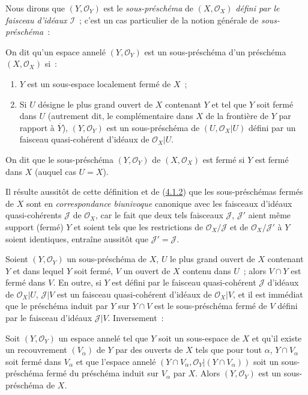 Nous dirons que $(Y,\mathscr{O}_Y)$ est le \emph{sous-préschéma} de
$(X,\mathscr{O}_X)$ \emph{défini par le faisceau d'idéaux $\mathscr{I}$}~;
c'est un cas particulier de la notion générale de \emph{sous-préschéma}~:

\begin{definition}[4.1.3]
\label{I.4.1.3-fr}
On dit qu'un espace annelé $(Y,\mathscr{O}_Y)$ est un
sous-préschéma d'un préschéma $(X,\mathscr{O}_X)$ si~:
\begin{enumerate}
  \item[$1^\circ$] $Y$ est un sous-espace localement fermé de $X$~;
  \item[$2^\circ$] Si $U$ désigne le plus grand ouvert de $X$ contenant $Y$
  et tel que $Y$ soit fermé dans $U$ (\textup{autrement dit,} le complémentaire dans
  $X$ de la frontière de $Y$ par rapport à $\overline{Y}$),
  $(Y,\mathscr{O}_Y)$ est un sous-préschéma de
  $(U,\mathscr{O}_X|U)$ défini par un faisceau quasi-cohérent d'idéaux de
  $\mathscr{O}_X|U$.
\end{enumerate}
On dit que le sous-préschéma $(Y,\mathscr{O}_Y)$ de $(X,\mathscr{O}_X)$ est
fermé si $Y$ est fermé dans $X$ (auquel cas $U=X$).
\end{definition}

Il résulte aussitôt de cette définition et de
(\hyperref[I.4.1.2-fr]{4.1.2}) que les sous-préschémas fermés de $X$ sont en
\emph{correspondance biunivoque} canonique avec les faisceaux d'idéaux
quasi-cohérents $\mathscr{J}$ de $\mathscr{O}_X$, car le fait que deux tels
faisceaux $\mathscr{J}$, $\mathscr{J}'$ aient même support (fermé) $Y$ et
soient tels que les restrictions de $\mathscr{O}_X/\mathscr{J}$ et de
$\mathscr{O}_X/\mathscr{J}'$ à $Y$ soient identiques, entraîne aussitôt que
$\mathscr{J}'=\mathscr{J}$.

\begin{env}[4.1.4]
\label{I.4.1.4-fr}
Soient $(Y,\mathscr{O}_Y)$ un sous-préschéma de $X$, $U$ le plus grand ouvert
de $X$ contenant $Y$ et dans lequel $Y$ soit fermé, $V$ un ouvert de $X$
contenu dans $U$~; alors $V\cap Y$ est fermé dans $V$. En outre, si $Y$ est
défini par le faisceau quasi-cohérent $\mathscr{J}$ d'idéaux de
$\mathscr{O}_X|U$, $\mathscr{J}|V$ est un faisceau quasi-cohérent d'idéaux de
$\mathscr{O}_X|V$, et il est immédiat que le préschéma induit par $Y$ sur
$Y\cap V$ est le sous-préschéma fermé de $V$ défini par le faisceau d'idéaux
$\mathscr{J}|V$. Inversement~:
\end{env}

\begin{proposition}[4.1.5]
\label{I.4.1.5-fr}
Soit $(Y,\mathscr{O}_Y)$ un espace annelé tel que $Y$ soit un sous-espace de
$X$ et qu'il existe un recouvrement $(V_\alpha)$ de $Y$ par des ouverts de
$X$ tels que pour tout $\alpha$, $Y\cap V_\alpha$ soit fermé dans $V_\alpha$
et que l'espace annelé
$(Y\cap V_\alpha,\mathscr{O}_Y|(Y\cap V_\alpha))$ soit un sous-préschéma
fermé du préschéma induit sur $V_\alpha$ par $X$. Alors
$(Y,\mathscr{O}_Y)$ est un sous-préschéma de $X$.
\end{proposition}

